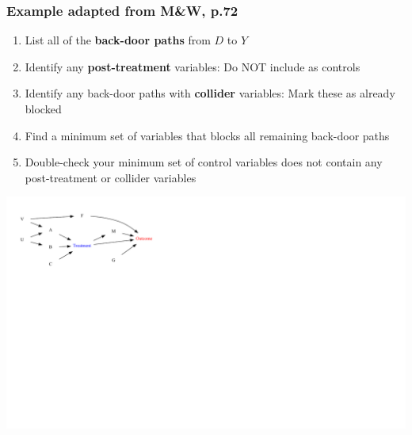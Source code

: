 \documentclass[xcolor=x11names,compress]{beamer}\usepackage[]{graphicx}\usepackage[]{color}
\newenvironment{knitrout}{}{} %
\renewcommand{\(}{\begin{columns}}
\renewcommand{\)}{\end{columns}}
\newcommand{\<}[1]{\begin{column}{#1}}
\renewcommand{\>}{\end{column}}
\begin{document}
\begin{frame}
\frametitle{Example adapted from M&W, p.72}
\begin{enumerate}
\footnotesize
\item List all of the \textbf{back-door paths} from $D$ to $Y$
\item Identify any \textbf{post-treatment} variables: Do NOT include as controls
\item Identify any back-door paths with \textbf{collider} variables: Mark these as already blocked
\item Find a minimum set of variables that blocks all remaining back-door paths
\item Double-check your minimum set of control variables does not contain any post-treatment or collider variables
\end{enumerate}
\normalsize
\begin{knitrout}
\color{fgcolor}
\includegraphics[width=2.4\linewidth]{figure/Dag5_eg-1} 

\end{knitrout}
\end{frame}
\end{document}
